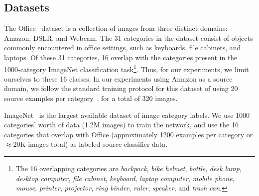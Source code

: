 \label{sec:eval}




\subsection{Datasets}
The Office~\cite{saenko-eccv10} dataset is a collection of images from three
distinct domains: Amazon, DSLR, and Webcam. The 31 categories in the dataset
consist of objects commonly encountered in office settings, such as keyboards,
file cabinets, and laptops. Of these 31 categories, 16 overlap with the
categories present in the 1000-category ImageNet classification task\footnote{
The 16 overlapping categories are
\textit{backpack},
 \textit{bike helmet},
 \textit{bottle},
 \textit{desk lamp},
 \textit{desktop computer},
 \textit{file cabinet},
 \textit{keyboard},
 \textit{laptop computer},
 \textit{mobile phone},
 \textit{mouse},
 \textit{printer},
 \textit{projector},
 \textit{ring binder},
 \textit{ruler},
 \textit{speaker},
 and
 \textit{trash can}.
}.
Thus, for our experiments, we limit ourselves to these
16 classes.  In our experiments using Amazon as a source domain,
we follow the standard training protocol for this dataset of using 20 source
examples per category~\cite{saenko-eccv10,gong-cvpr12}, for a total of 320
images.

ImageNet~\cite{ilsvrc2012} is the largest available dataset of image category labels. We use 1000 categories' worth of data (1.2M images) to train the network, and use the 16 categories that overlap with Office (approximately 1200 examples per category or  $\approx$20K images total) as labeled source classifier data.


